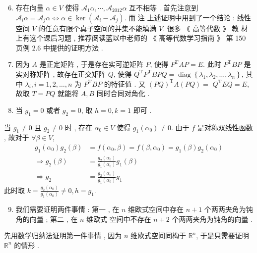 \documentclass[10pt]{article}
\begin{document}
\begin{enumerate}
  \setcounter{enumi}{5}
  \item  存在向量  $\alpha \in V$  使得  $\mathcal{A}_{1} \alpha, \cdots, \mathcal{A}_{2012} \alpha$  互不相等 .  首先注意到  $\mathcal{A}_{i} \alpha=\mathcal{A}_{j} \alpha \Longleftrightarrow \alpha \in \operatorname{ker}\left(\mathcal{A}_{i}-\mathcal{A}_{j}\right)$.  而   注   上述证明中用到了一个结论 :  线性空间  $V$  的任意有限个真子空间的并集不能填满  $V$.  很多 《 高等代数 》 教   材上有这个课后习题 ,  推荐阅读蓝以中老师的 《 高等代数学习指南 》 第  150  页例  $2.6$  中提供的证明方法 .

  \item  因为  $A$  是正定矩阵 ,  于是存在实可逆矩阵  $P$,  使得  $P^{\mathrm{T}} A P=E$.  此时  $P^{\mathrm{T}} B P$  是实对称矩阵 ,  故存在正交矩阵  $Q$,  使得  $Q^{\mathrm{T}} P^{\mathrm{T}} B P Q=\operatorname{diag}\left\{\lambda_{1}, \lambda_{2}, \ldots, \lambda_{n}\right\}$,  其中  $\lambda_{i}, i=1,2, \ldots, n$  为  $P^{\mathrm{T}} B P$  的特征值 .  又  $(P Q)^{\mathrm{T}} A(P Q)=$ $Q^{\mathrm{T}} E Q=E$,  故取  $T=P Q$  就能将  $A, B$  同时合同对角化 .

  \item  当  $g_{1}=0$  或者  $g_{2}=0$,  取  $h=0, k=1$  即可 .

\end{enumerate}
 当  $g_{1} \neq 0$  且  $g_{2} \neq 0$  时 ,  存在  $\alpha_{0} \in V$  使得  $g_{1}\left(\alpha_{0}\right) \neq 0$.  由于  $f$  是对称双线性函数 ,  故对于  $\forall \beta \in V$,
$$
\begin{aligned}
g_{1}\left(\alpha_{0}\right) g_{2}(\beta) &=f\left(\alpha_{0}, \beta\right)=f\left(\beta, \alpha_{0}\right)=g_{1}(\beta) g_{2}\left(\alpha_{0}\right) \\
\Longrightarrow g_{2}(\beta) &=\frac{g_{2}\left(\alpha_{0}\right)}{g_{1}\left(\alpha_{0}\right)} g_{1}(\beta) \\
\Longrightarrow g_{2} &=\frac{g_{2}\left(\alpha_{0}\right)}{g_{1}\left(\alpha_{0}\right)} g_{1}
\end{aligned}
$$
 此时取  $k=\frac{g_{2}\left(\alpha_{0}\right)}{g_{1}\left(\alpha_{0}\right)} \neq 0, h=g_{1}$.

\begin{enumerate}
  \setcounter{enumi}{8}
  \item  我们需要证明两件事情 :  第一 ,  在  $n$  维欧式空间中存在  $n+1$  个两两夹角为钝角的向量 ;  第二 ,  在  $n$  维欧式   空间中不存在  $n+2$  个两两夹角为钝角的向量 .
\end{enumerate}
 先用数学归纳法证明第一件事情 ,  因为  $n$  维欧式空间同构于  $\mathbb{R}^{n}$,  于是只需要证明  $\mathbb{R}^{n}$  的情形 .
\end{document}
